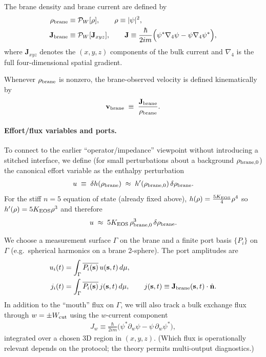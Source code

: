 \documentclass[11pt]{article}
\begin{document}
The brane density and brane current are defined by
\begin{align}
\rho_{\rm brane} &\equiv \mathcal{P}_W[\rho], \qquad \rho \equiv |\psi|^2,\\
\mathbf{J}_{\rm brane} &\equiv \mathcal{P}_W[\mathbf{J}_{xyz}],
\qquad
\mathbf{J} \equiv \frac{\hbar}{2im}\Big(\psi^\ast \nabla_4 \psi-\psi \nabla_4 \psi^\ast\Big),
\end{align}
where $\mathbf{J}_{xyz}$ denotes the $(x,y,z)$ components of the bulk current and
$\nabla_4$ is the full four-dimensional spatial gradient.

Whenever $\rho_{\rm brane}$ is nonzero, the brane-observed velocity is defined
kinematically by
\begin{align}
\mathbf{v}_{\rm brane} \;\equiv\; \frac{\mathbf{J}_{\rm brane}}{\rho_{\rm brane}}.
\end{align}

\paragraph{Effort/flux variables and ports.}
To connect to the earlier ``operator/impedance'' viewpoint without introducing
a stitched interface, we define (for small perturbations about a background
$\rho_{\rm brane,0}$) the canonical effort variable as the enthalpy perturbation
\begin{align}
u \;\equiv\; \delta h(\rho_{\rm brane})
\;\approx\; h'(\rho_{\rm brane,0})\,\delta\rho_{\rm brane}.
\end{align}
For the stiff $n=5$ equation of state (already fixed above),
$h(\rho)=\frac{5K_{\rm EOS}}{4}\rho^4$ so $h'(\rho)=5K_{\rm EOS}\rho^3$ and therefore
\begin{align}
u \;\approx\; 5K_{\rm EOS}\,\rho_{\rm brane,0}^3\,\delta\rho_{\rm brane}.
\end{align}

We choose a measurement surface $\Gamma$ on the brane and a finite port basis
$\{P_i\}$ on $\Gamma$ (e.g.\ spherical harmonics on a brane 2-sphere).  The port
amplitudes are
\begin{align}
u_i(t) &= \int_{\Gamma}\overline{P_i(\mathbf{s})}\,u(\mathbf{s},t)\,d\mu,\\
j_i(t) &= \int_{\Gamma}\overline{P_i(\mathbf{s})}\,j(\mathbf{s},t)\,d\mu,
\qquad j(\mathbf{s},t)\equiv \mathbf{J}_{\rm brane}(\mathbf{s},t)\cdot \hat{\mathbf{n}}.
\end{align}
In addition to the ``mouth'' flux on $\Gamma$, we will also track a bulk
exchange flux through $w=\pm W_{\rm cut}$ using the $w$-current component
\begin{align}
J_w \equiv \frac{\hbar}{2im}\Big(\psi^\ast \partial_w \psi-\psi\,\partial_w \psi^\ast\Big),
\end{align}
integrated over a chosen 3D region in $(x,y,z)$.  (Which flux is operationally
relevant depends on the protocol; the theory permits multi-output diagnostics.)
\end{document}
